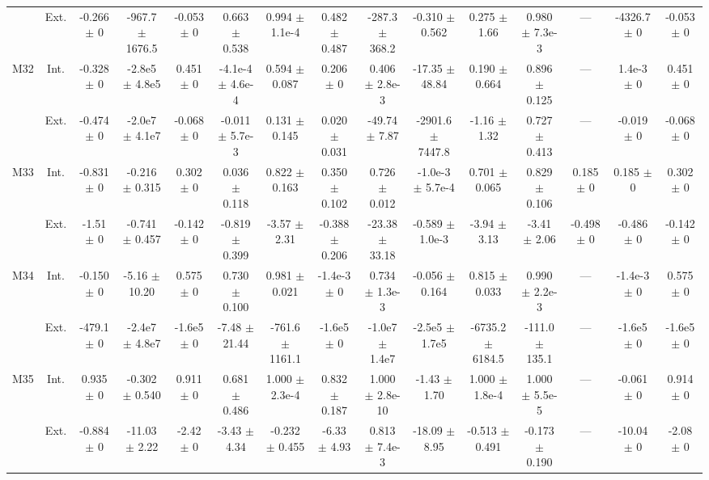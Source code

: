 \begin{table}[htbp]
{\begin{tabular}{@{}ccccccccccccccc@{}}
 & Ext. & -0.266 $\pm$ 0 & -967.7 $\pm$ 1676.5 & -0.053 $\pm$ 0 & 0.663 $\pm$ 0.538 & 0.994 $\pm$ 1.1e-4 & 0.482 $\pm$ 0.487 & -287.3 $\pm$ 368.2 & -0.310 $\pm$ 0.562 & 0.275 $\pm$ 1.66 & 0.980 $\pm$ 7.3e-3 & --- & -4326.7 $\pm$ 0 & -0.053 $\pm$ 0 \\
\cline{2-15}
\multirow{2}{*}{M32} & Int. & -0.328 $\pm$ 0 & -2.8e5 $\pm$ 4.8e5 & 0.451 $\pm$ 0 & -4.1e-4 $\pm$ 4.6e-4 & 0.594 $\pm$ 0.087 & 0.206 $\pm$ 0 & 0.406 $\pm$ 2.8e-3 & -17.35 $\pm$ 48.84 & 0.190 $\pm$ 0.664 & 0.896 $\pm$ 0.125 & --- & 1.4e-3 $\pm$ 0 & 0.451 $\pm$ 0 \\
 & Ext. & -0.474 $\pm$ 0 & -2.0e7 $\pm$ 4.1e7 & -0.068 $\pm$ 0 & -0.011 $\pm$ 5.7e-3 & 0.131 $\pm$ 0.145 & 0.020 $\pm$ 0.031 & -49.74 $\pm$ 7.87 & -2901.6 $\pm$ 7447.8 & -1.16 $\pm$ 1.32 & 0.727 $\pm$ 0.413 & --- & -0.019 $\pm$ 0 & -0.068 $\pm$ 0 \\
\cline{2-15}
\multirow{2}{*}{M33} & Int. & -0.831 $\pm$ 0 & -0.216 $\pm$ 0.315 & 0.302 $\pm$ 0 & 0.036 $\pm$ 0.118 & 0.822 $\pm$ 0.163 & 0.350 $\pm$ 0.102 & 0.726 $\pm$ 0.012 & -1.0e-3 $\pm$ 5.7e-4 & 0.701 $\pm$ 0.065 & 0.829 $\pm$ 0.106 & 0.185 $\pm$ 0 & 0.185 $\pm$ 0 & 0.302 $\pm$ 0 \\
 & Ext. & -1.51 $\pm$ 0 & -0.741 $\pm$ 0.457 & -0.142 $\pm$ 0 & -0.819 $\pm$ 0.399 & -3.57 $\pm$ 2.31 & -0.388 $\pm$ 0.206 & -23.38 $\pm$ 33.18 & -0.589 $\pm$ 1.0e-3 & -3.94 $\pm$ 3.13 & -3.41 $\pm$ 2.06 & -0.498 $\pm$ 0 & -0.486 $\pm$ 0 & -0.142 $\pm$ 0 \\
\cline{2-15}
\multirow{2}{*}{M34} & Int. & -0.150 $\pm$ 0 & -5.16 $\pm$ 10.20 & 0.575 $\pm$ 0 & 0.730 $\pm$ 0.100 & 0.981 $\pm$ 0.021 & -1.4e-3 $\pm$ 0 & 0.734 $\pm$ 1.3e-3 & -0.056 $\pm$ 0.164 & 0.815 $\pm$ 0.033 & 0.990 $\pm$ 2.2e-3 & --- & -1.4e-3 $\pm$ 0 & 0.575 $\pm$ 0 \\
 & Ext. & -479.1 $\pm$ 0 & -2.4e7 $\pm$ 4.8e7 & -1.6e5 $\pm$ 0 & -7.48 $\pm$ 21.44 & -761.6 $\pm$ 1161.1 & -1.6e5 $\pm$ 0 & -1.0e7 $\pm$ 1.4e7 & -2.5e5 $\pm$ 1.7e5 & -6735.2 $\pm$ 6184.5 & -111.0 $\pm$ 135.1 & --- & -1.6e5 $\pm$ 0 & -1.6e5 $\pm$ 0 \\
\cline{2-15}
\multirow{2}{*}{M35} & Int. & 0.935 $\pm$ 0 & -0.302 $\pm$ 0.540 & 0.911 $\pm$ 0 & 0.681 $\pm$ 0.486 & 1.000 $\pm$ 2.3e-4 & 0.832 $\pm$ 0.187 & 1.000 $\pm$ 2.8e-10 & -1.43 $\pm$ 1.70 & 1.000 $\pm$ 1.8e-4 & 1.000 $\pm$ 5.5e-5 & --- & -0.061 $\pm$ 0 & 0.914 $\pm$ 0 \\
 & Ext. & -0.884 $\pm$ 0 & -11.03 $\pm$ 2.22 & -2.42 $\pm$ 0 & -3.43 $\pm$ 4.34 & -0.232 $\pm$ 0.455 & -6.33 $\pm$ 4.93 & 0.813 $\pm$ 7.4e-3 & -18.09 $\pm$ 8.95 & -0.513 $\pm$ 0.491 & -0.173 $\pm$ 0.190 & --- & -10.04 $\pm$ 0 & -2.08 $\pm$ 0 \\

\end{tabular}}
\end{table}
